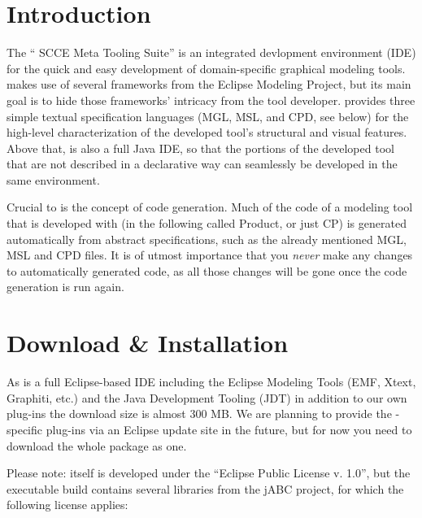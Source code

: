 \documentclass[a4paper,american,12pt]{scrreprt}
\begin{document}
\section{Introduction}

The ``\cinco{} SCCE Meta Tooling Suite'' is an integrated devlopment environment
(IDE) for the quick and easy development of domain-specific graphical modeling
tools. \cinco{} makes use of several frameworks from the Eclipse Modeling
Project, but its main goal is to hide those frameworks' intricacy from the
tool developer. \cinco{} provides three simple textual specification languages (MGL,
MSL, and CPD, see below) for the high-level characterization of the developed tool's
structural and visual features. Above that, \cinco{} is also a full Java IDE, so
that the portions of the developed tool that are not described in a declarative
way can seamlessly be developed in the same environment.

Crucial to \cinco is the concept of code generation. Much of the code of a
modeling tool that is developed with \cinco (in the following called \cinco
Product, or just CP) is generated automatically from abstract specifications,
such as the already mentioned MGL, MSL and CPD files. It is of utmost importance
that you \emph{never} make any changes to automatically generated
code\footnotemark{}, as all those changes will be gone once the code generation
is run again.


\section{Download \& Installation}

As \cinco{} is a full Eclipse-based IDE including the Eclipse Modeling Tools
(EMF, Xtext, Graphiti, etc.) and the Java Development Tooling (JDT) in addition
to our own plug-ins the download size is almost 300 MB. We are planning to
provide the \cinco{}-specific plug-ins via an Eclipse update site in the future,
but for now you need to download the whole package as one.

Please note: \cinco{} itself is developed under the ``Eclipse Public License v. 1.0'', 
but the executable build contains several libraries from the jABC
project, for which the following license applies:
\end{document}

